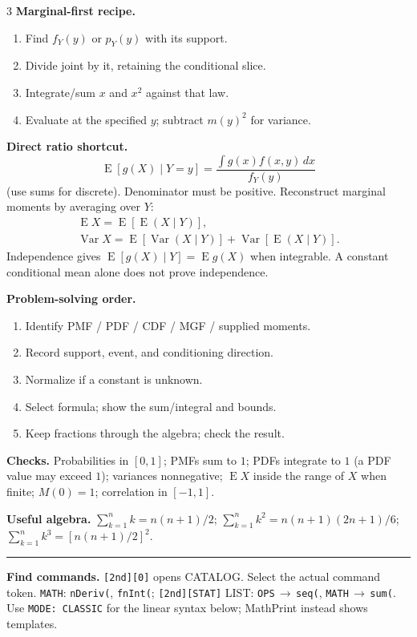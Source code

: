 \documentclass[letterpaper,landscape]{article}
\DeclareMathOperator{\E}{E}
\DeclareMathOperator{\Var}{Var}
\newcommand{\dd}{\,d}
\newcommand{\head}[1]{\vspace{3pt}{\color{navy}\bfseries\fontsize{10}{11}\selectfont #1}\par\vspace{1pt}\hrule\vspace{3pt}}
\newcommand{\mini}[1]{{\bfseries #1}}
\begin{document}
\begin{multicols*}{3}
\mini{Marginal-first recipe.}
\begin{enumerate}[leftmargin=12pt,itemsep=1pt,topsep=1pt]
\item Find $f_Y(y)$ or $p_Y(y)$ with its support.
\item Divide joint by it, retaining the conditional slice.
\item Integrate/sum $x$ and $x^2$ against that law.
\item Evaluate at the specified $y$; subtract $m(y)^2$ for variance.
\end{enumerate}
\mini{Direct ratio shortcut.}
\[
 \E[g(X)\mid Y=y]
 =\frac{\int g(x)f(x,y)\dd x}{f_Y(y)}
\]
(use sums for discrete). Denominator must be positive. Reconstruct marginal moments by averaging over $Y$:
\[
\begin{gathered}
 \E X=\E[\E(X\mid Y)],\\
 \Var X=\E[\Var(X\mid Y)]
          +\Var[\E(X\mid Y)].
\end{gathered}
\]
Independence gives $\E[g(X)\mid Y]=\E g(X)$ when integrable. A constant conditional mean alone does not prove independence.

\mini{Problem-solving order.}
\begin{enumerate}[leftmargin=12pt,itemsep=1pt,topsep=1pt]
\item Identify PMF / PDF / CDF / MGF / supplied moments.
\item Record support, event, and conditioning direction.
\item Normalize if a constant is unknown.
\item Select formula; show the sum/integral and bounds.
\item Keep fractions through the algebra; check the result.
\end{enumerate}
\mini{Checks.} Probabilities in $[0,1]$; PMFs sum to $1$; PDFs integrate to $1$ (a PDF value may exceed $1$); variances nonnegative; $\E X$ inside the range of $X$ when finite; $M(0)=1$; correlation in $[-1,1]$.

\mini{Useful algebra.}
$\sum_{k=1}^{n}k=n(n+1)/2$;
$\sum_{k=1}^{n}k^2=n(n+1)(2n+1)/6$;
$\sum_{k=1}^{n}k^3=[n(n+1)/2]^2$.

\columnbreak
\head{6\quad TI-84 Plus CE: useful checks}
\mini{Find commands.} \texttt{[2nd][0]} opens CATALOG. Select the actual command token. \texttt{MATH}: \texttt{nDeriv(}, \texttt{fnInt(}; \texttt{[2nd][STAT]} LIST: \texttt{OPS}\,$\to$\,\texttt{seq(}, \texttt{MATH}\,$\to$\,\texttt{sum(}. Use \texttt{MODE: CLASSIC} for the linear syntax below; MathPrint instead shows templates.


\end{multicols*}
\end{document}
